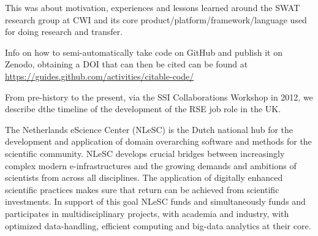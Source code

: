 \documentclass[a4paper,UKenglish]{dagrep}
\begin{document}

This was about motivation, experiences and lessons learned around the SWAT research group at CWI and its core product/platform/framework/language used for doing research and transfer.


Info on how to semi-automatically take code on GitHub and publish it on Zenodo, obtaining a DOI that can then be cited can be found at \url{https://guides.github.com/activities/citable-code/}





From pre-history to the present, via the SSI Collaborations Workshop in 2012, we describe dthe timeline of the development of the RSE job role in the UK.






The Netherlands eScience Center (NLeSC) is the Dutch national hub for
the development and application of domain overarching software and
methods for the scientific community. NLeSC develops crucial bridges
between increasingly complex modern e-infrastructures and the growing
demands and ambitions of scientists from across all disciplines. The
application of digitally enhanced scientific practices makes sure that
return can be achieved from scientific investments. In support of this
goal NLeSC funds and simultaneously funds and participates in
multidisciplinary projects, with academia and industry, with optimized
data-handling, efficient computing and big-data analytics at their
core.
\end{document}
